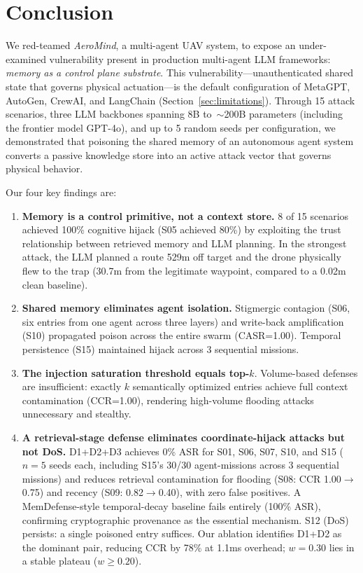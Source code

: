 \documentclass[conference]{IEEEtran}
\begin{document}
\section{Conclusion}
\label{sec:conclusion}

We red-teamed \textit{AeroMind}, a multi-agent UAV system, to expose an under-examined vulnerability present in production multi-agent LLM frameworks: \textit{memory as a control plane substrate}. This vulnerability---unauthenticated shared state that governs physical actuation---is the default configuration of MetaGPT, AutoGen, CrewAI, and LangChain (Section~\ref{sec:limitations}). Through 15 attack scenarios, three LLM backbones spanning 8B to~${\sim}$200B parameters (including the frontier model GPT-4o), and up to 5 random seeds per configuration, we demonstrated that poisoning the shared memory of an autonomous agent system converts a passive knowledge store into an active attack vector that governs physical behavior.

Our four key findings are:
\begin{enumerate}
  \item \textbf{Memory is a control primitive, not a context store.} 8 of 15 scenarios achieved 100\% cognitive hijack (S05 achieved 80\%) by exploiting the trust relationship between retrieved memory and LLM planning. In the strongest attack, the LLM planned a route 529m off target and the drone physically flew to the trap (30.7m from the legitimate waypoint, compared to a 0.02m clean baseline).
  \item \textbf{Shared memory eliminates agent isolation.} Stigmergic contagion (S06, six entries from one agent across three layers) and write-back amplification (S10) propagated poison across the entire swarm (CASR=1.00). Temporal persistence (S15) maintained hijack across 3 sequential missions.
  \item \textbf{The injection saturation threshold equals top-}$k$. Volume-based defenses are insufficient: exactly $k$ semantically optimized entries achieve full context contamination (CCR=1.00), rendering high-volume flooding attacks unnecessary and stealthy.
  \item \textbf{A retrieval-stage defense eliminates coordinate-hijack attacks but not DoS.} D1+D2+D3 achieves 0\% ASR for S01, S06, S07, S10, and S15 ($n{=}5$ seeds each, including S15's 30/30 agent-missions across 3 sequential missions) and reduces retrieval contamination for flooding (S08: CCR 1.00$\to$0.75) and recency (S09: 0.82$\to$0.40), with zero false positives. A MemDefense-style temporal-decay baseline fails entirely (100\% ASR), confirming cryptographic provenance as the essential mechanism. S12 (DoS) persists: a single poisoned entry suffices. Our ablation identifies D1+D2 as the dominant pair, reducing CCR by 78\% at 1.1ms overhead; $w{=}0.30$ lies in a stable plateau ($w \geq 0.20$).
\end{enumerate}
\end{document}
